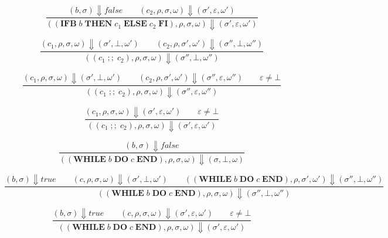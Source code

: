 \begin{equation}
\frac{(b, \sigma) \Downarrow false \qquad (c_2, \rho, \sigma, \omega) \Downarrow (\sigma', \varepsilon, \omega')}{((\textbf{IFB}\; b\; \textbf{THEN}\; c_1\; \textbf{ELSE}\; c_2\; \textbf{FI}), \rho, \sigma, \omega) \Downarrow (\sigma', \varepsilon, \omega')}
\end{equation}

\begin{equation}
\frac{(c_1, \rho, \sigma, \omega) \Downarrow (\sigma', \bot, \omega') \qquad (c_2, \rho, \sigma', \omega') \Downarrow (\sigma'', \bot, \omega'')}{((c_1\; ;;\; c_2), \rho, \sigma, \omega) \Downarrow (\sigma'', \bot, \omega'')}
\end{equation}

\begin{equation}
\frac{(c_1, \rho, \sigma, \omega) \Downarrow (\sigma', \bot, \omega') \qquad (c_2, \rho, \sigma', \omega') \Downarrow (\sigma'', \varepsilon, \omega'') \qquad \varepsilon \neq \bot}{((c_1\; ;;\; c_2), \rho, \sigma, \omega) \Downarrow (\sigma'', \varepsilon, \omega'')}
\end{equation}

\begin{equation}
\frac{(c_1, \rho, \sigma, \omega) \Downarrow (\sigma', \varepsilon, \omega') \qquad \varepsilon \neq \bot}{((c_1\; ;;\; c_2), \rho, \sigma, \omega) \Downarrow (\sigma', \varepsilon, \omega')}
\end{equation}

\begin{equation}
\frac{(b, \sigma) \Downarrow false}{((\textbf{WHILE}\; b\; \textbf{DO}\; c\; \textbf{END}), \rho, \sigma, \omega) \Downarrow (\sigma, \bot, \omega)}
\end{equation}

\begin{equation}
\frac{(b, \sigma) \Downarrow true \qquad (c, \rho, \sigma, \omega) \Downarrow (\sigma', \bot, \omega') \qquad ((\textbf{WHILE}\; b\; \textbf{DO}\; c\; \textbf{END}), \rho, \sigma', \omega') \Downarrow (\sigma'', \bot, \omega'')}{((\textbf{WHILE}\; b\; \textbf{DO}\; c\; \textbf{END}), \rho, \sigma, \omega) \Downarrow (\sigma'', \bot, \omega'')}
\end{equation}

\begin{equation}
\frac{(b, \sigma) \Downarrow true \qquad (c, \rho, \sigma, \omega) \Downarrow (\sigma', \varepsilon, \omega') \qquad \varepsilon \neq \bot}{((\textbf{WHILE}\; b\; \textbf{DO}\; c\; \textbf{END}), \rho, \sigma, \omega) \Downarrow (\sigma', \varepsilon, \omega')}
\end{equation}

